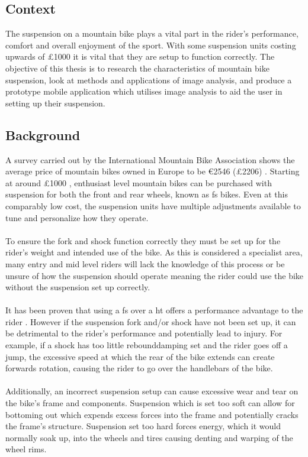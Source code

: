 \subsection{Context}
	The suspension on a mountain bike plays a vital part in the rider's performance, comfort and overall enjoyment of the sport. With some suspension units costing upwards of \pounds1000 it is vital that they are setup to function correctly. The objective of this thesis is to research the characteristics of mountain bike suspension, look at methods and applications of image analysis, and produce a prototype mobile application which utilises image analysis to aid the user in setting up their suspension.
\subsection{Background}
	A survey carried out by the International Mountain Bike Association shows the average price of mountain bikes owned in Europe to be \euro2546 (\pounds2206) \citep{imbasurv}. Starting at around \pounds1000 \citep{giantstance}, enthusiast level mountain bikes can be purchased with suspension for both the front and rear wheels, known as \gls{fs} bikes. Even at this comparably low cost, the suspension units have multiple adjustments available to tune and personalize how they operate.
	\\\\
	To ensure the \gls{fork} and \gls{shock} function correctly they must be set up for the rider's weight and intended use of the bike. As this is considered a specialist area, many entry and mid level riders will lack the knowledge of this process or be unsure of how the suspension should operate meaning the rider could use the bike without the suspension set up correctly.
	\\\\
	It has been proven that using a \gls{fs} over a \gls{ht} offers a performance advantage to the rider \citep{fullsusperf}. However if the suspension fork and/or shock have not been set up, it can be detrimental to the rider's performance and potentially lead to injury. For example, if a shock has too little \gls{rebounddamping} set and the rider goes off a jump, the excessive speed at which the rear of the bike extends can create forwards rotation, causing the rider to go over the handlebars of the bike.
	\\\\
	Additionally, an incorrect suspension setup can cause excessive wear and tear on the bike's frame and components. Suspension which is set too soft can allow for bottoming out which expends excess forces into the frame and potentially cracks the frame's structure. Suspension set too hard forces energy, which it would normally soak up, into the wheels and tires causing denting and warping of the wheel rims.
